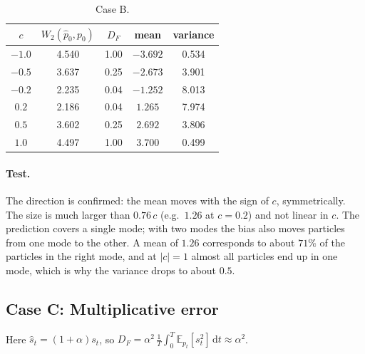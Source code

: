 \documentclass[11pt]{article}
\newcommand{\E}{\mathbb{E}}
\newcommand{\dd}{\mathrm{d}}
\begin{document}
\begin{table}[H]
\centering
\begin{tabular}{ccccc}
\hline
$c$ & $W_2(\hat p_0,p_0)$ & $D_F$ & mean & variance \\
\hline
$-1.0$ & 4.540 & 1.00 & $-3.692$ & 0.534 \\
$-0.5$ & 3.637 & 0.25 & $-2.673$ & 3.901 \\
$-0.2$ & 2.235 & 0.04 & $-1.252$ & 8.013 \\
$0.2$ & 2.186 & 0.04 & $1.265$ & 7.974 \\
$0.5$ & 3.602 & 0.25 & $2.692$ & 3.806 \\
$1.0$ & 4.497 & 1.00 & $3.700$ & 0.499 \\
\hline
\end{tabular}
\caption{Case B.}
\label{tab:caseB}
\end{table}

\paragraph{Test.} The direction is confirmed: the mean moves with the sign of $c$, symmetrically. The size is much larger
than $0.76\,c$ (e.g.\ $1.26$ at $c=0.2$) and not linear in $c$. The prediction covers a single mode; with two modes the bias also
moves particles from one mode to the other. A mean of $1.26$ corresponds to about $71\%$ of the particles in the right mode,
and at $|c|=1$ almost all particles end up in one mode, which is why the variance drops to about $0.5$.

\subsection*{Case C: Multiplicative error}

Here $\hat s_t = (1+\alpha)s_t$, so $D_F = \alpha^2\,\frac1T\int_0^T\E_{p_t}[s_t^2]\,\dd t\approx\alpha^2$.
\end{document}
